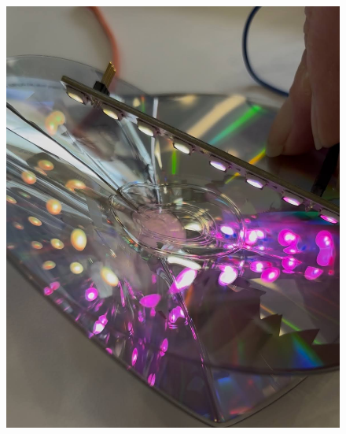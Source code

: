 \documentclass{article}
\begin{document}
\begin{figure} [h]
    \centering
  \begin{minipage}[b]{0.4\textwidth}
    \includegraphics[width=\textwidth]{images/unnamed4.jpg}
  \end{minipage}
  \hfill
  \begin{minipage}[b]{0.4\textwidth}

\end{minipage}
\end{figure}
\end{document}
